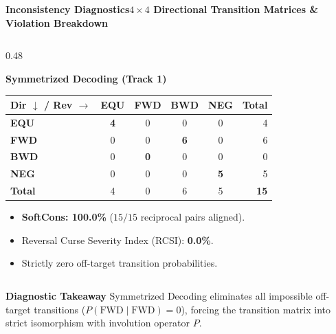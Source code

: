 \documentclass[aspectratio=169,10pt]{beamer}
\begin{document}
\begin{frame}{\textbf{Inconsistency Diagnostics}}{\textbf{$4 \times 4$ Directional Transition Matrices \& Violation Breakdown}}
\begin{columns}[T]
    \begin{column}{0.48\textwidth}
      \begin{exampleblock}{\textbf{Symmetrized Decoding (Track 1)}}
        \centering
        \scriptsize
        \setlength{\tabcolsep}{2.5pt}
        \vspace{0.05cm}
        \begin{tabular}{l|cccc|r}
          \toprule
          \textbf{Dir $\downarrow$ / Rev $\rightarrow$} & \textbf{EQU} & \textbf{FWD} & \textbf{BWD} & \textbf{NEG} & \textbf{Total} \\
          \midrule
          \textbf{EQU} & \textbf{4} & 0 & 0 & 0 & 4 \\
          \textbf{FWD} & 0 & 0 & \textbf{6} & 0 & 6 \\
          \textbf{BWD} & 0 & \textbf{0} & 0 & 0 & 0 \\
          \textbf{NEG} & 0 & 0 & 0 & \textbf{5} & 5 \\
          \midrule
          \textbf{Total} & 4 & 0 & 6 & 5 & \textbf{15} \\
          \bottomrule
        \end{tabular}
        \vspace{0.05cm}
        \begin{itemize}\setlength{\itemsep}{0pt}\setlength{\parskip}{0pt}
          \item \textbf{SoftCons: 100.0\%} ($15/15$ reciprocal pairs aligned).
          \item Reversal Curse Severity Index (RCSI): \textbf{0.0\%}.
          \item Strictly zero off-target transition probabilities.
        \end{itemize}
      \end{exampleblock}
    \end{column}
  \end{columns}
  \vspace{0.03cm}
  \begin{alertblock}{\textbf{Diagnostic Takeaway}}
    \scriptsize
    Symmetrized Decoding eliminates all impossible off-target transitions ($P(\text{FWD} \mid \text{FWD}) = 0$), forcing the transition matrix into strict isomorphism with involution operator $P$.
  \end{alertblock}
\end{frame}
\end{document}
